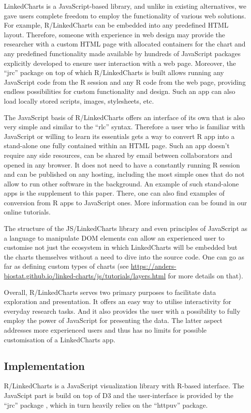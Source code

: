 \documentclass[twocolumn,10pt]{article}
\begin{document}
LinkedCharts is a JavaScript-based library, and unlike in existing alternatives, we gave users complete freedom to employ the functionality of various web solutions. For example, R/LinkedCharts can be embedded into any predefined HTML layout. Therefore, someone with experience in web design may provide the researcher with a custom HTML page with allocated containers for the chart and any predefined functionality made available by hundreds of JavaScript packages explicitly developed to ensure user interaction with a web page. Moreover, the ``jrc'' package on top of which R/LinkedCharts is built allows running any JavaScript code from the R session and any R code from the web page, providing endless possibilities for custom functionality and design. Such an app can also load locally stored scripts, images, stylesheets, etc.

The JavaScript basis of R/LinkedCharts offers an interface of its own that is also very simple and similar to the ``rlc'' syntax. Therefore a user who is familiar with JavaScript or willing to learn its essentials gets a way to convert R app into a stand-alone one fully contained within an HTML page. Such an app doesn't require any side resources, can be shared by email between collaborators and opened in any browser. It does not need to have a constantly running R session and can be published on any hosting, including the most simple ones that do not allow to run other software in the background. An example of such stand-alone apps is the supplement to this paper. There, one can also find examples of conversion from R apps to JavaScript ones. More information can be found in our online tutorials.

The structure of the JS/LinkedCharts library and even principles of JavaScript as a language to manipulate DOM elements can allow an experienced user to customise not just the ecosystem in which LinkedCharts will be embedded but the charts themselves without a need to dive into the source code. One can go as far as defining custom types of charts (see \url{https://anders-biostat.github.io/linked-charts/js/tutorials/layers.html} for more details on that).

Overall, R/LinkedCharts serves two primary purposes to facilitate data exploration and presentation. It offers an easy way to utilise interactivity for everyday research tasks. And it also provides the user with a possibility to fully employ the power of JavaScript for presenting the data. The latter aspect addresses more experienced users and thus has no limits for possible customisation of a LinkedCharts app.


\subsection{Implementation}

R/LinkedCharts is a JavaScript visualization library with R-based \citep{R_2019} interface. The JavaScipt part is build on top of D3 \citep{bostock_2011} and the user-interface is provided by the ``jrc'' package \citep{jrc_2020}, which in turn heavily relies on the ``httpuv'' \citep{cheng_2020} package.


\begin{small} 

\end{small}
\end{document}
